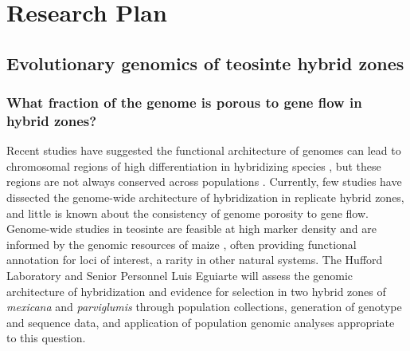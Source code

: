 \section*{Research Plan}

\subsection{Evolutionary genomics of teosinte hybrid zones}
\label{ss:hybrids}
\subsubsection{What fraction of the genome is porous to gene flow in hybrid zones?}
\label{sss:genomescan}
Recent studies have suggested the functional architecture of genomes can lead to chromosomal regions of high differentiation in hybridizing species \citep{renaut2013}, but these regions are not always conserved across populations \citep{Parchman2013}. Currently, few studies have dissected the genome-wide architecture of hybridization in replicate hybrid zones, and little is known about the consistency of genome porosity to gene flow. Genome-wide studies in teosinte are feasible at high marker density \citep{Hufford2012b, Hufford2013, Pyhajarvi2013} and are informed by the genomic resources of maize \citep{Hufford2012}, often providing functional annotation for loci of interest, a rarity in other natural systems.  The Hufford Laboratory and Senior Personnel Luis Eguiarte will assess the genomic architecture of hybridization and evidence for selection in two hybrid zones of \emph{mexicana} and \emph{parviglumis} through population collections, generation of genotype and sequence data, and application of population genomic analyses appropriate to this question. 

